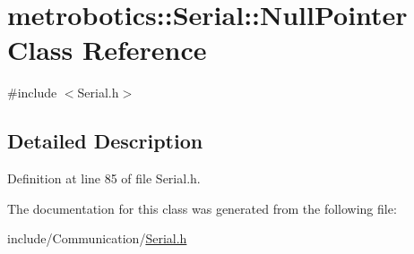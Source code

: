 \hypertarget{classmetrobotics_1_1Serial_1_1NullPointer}{\section{metrobotics\-:\-:\-Serial\-:\-:\-Null\-Pointer \-Class \-Reference}
\label{classmetrobotics_1_1Serial_1_1NullPointer}
}


{\ttfamily \#include $<$\-Serial.\-h$>$}



\subsection{\-Detailed \-Description}


\-Definition at line 85 of file \-Serial.\-h.



\-The documentation for this class was generated from the following file\-:\begin{DoxyCompactItemize}
\item 
include/\-Communication/\hyperlink{Serial_8h}{\-Serial.\-h}\end{DoxyCompactItemize}
